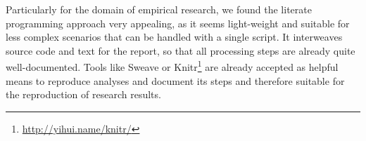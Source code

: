 \documentclass{acm_proc_article-sp}
\begin{document}
Particularly for the domain of empirical research, we found the literate programming approach very appealing, as it seems light-weight and suitable for less complex scenarios that can be handled with a single script.
It interweaves source code and text for the report, so that all processing steps are already quite well-documented. 
Tools like Sweave \cite{lmucs_papers_Leisch_2002} or Knitr\footnote{\url{http://yihui.name/knitr/}} are already accepted as helpful means to reproduce analyses and document its steps
\cite{leisch2011executable}
%
\cite{rossini2003literate}
and therefore suitable for the reproduction of research results. 

%
%
%
%

\end{document}
